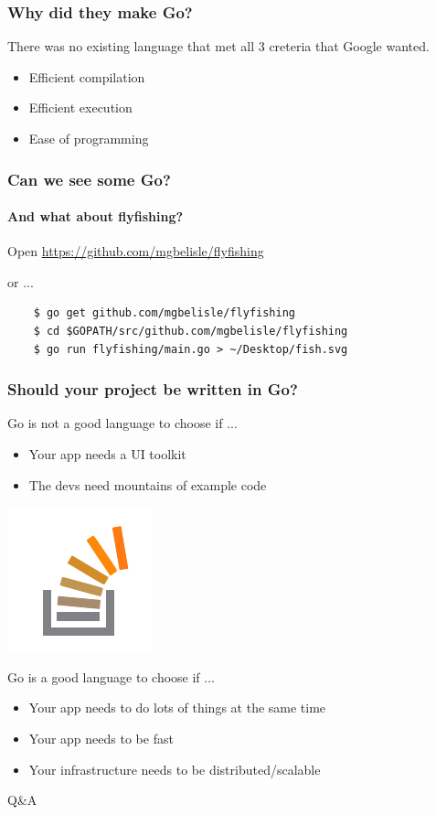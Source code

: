 \documentclass{beamer}
\begin{document}
\begin{frame}
  \frametitle{Why did they make Go?}

  There was no existing language that met all 3 creteria that Google
  wanted.
  
  \begin{itemize}
    \item Efficient compilation
    \item Efficient execution
    \item Ease of programming
  \end{itemize}
\end{frame}
\begin{frame}[fragile]
  \frametitle{Can we see some Go?}
  \framesubtitle{And what about flyfishing?}
  \begin{center}
    Open \url{https://github.com/mgbelisle/flyfishing}
    \bigskip

    or ...
  \end{center}  
  \begin{verbatim}
    $ go get github.com/mgbelisle/flyfishing
    $ cd $GOPATH/src/github.com/mgbelisle/flyfishing
    $ go run flyfishing/main.go > ~/Desktop/fish.svg
  \end{verbatim}
\end{frame}
\begin{frame}
  \frametitle{Should your project be written in Go?}
  Go is not a good language to choose if ...
  \begin{itemize}
    \item Your app needs a UI toolkit
    \item The devs need mountains of example code
  \end{itemize}
  \vfill
  \begin{flushright}
    \includegraphics[height=3\baselineskip]{includes/stackoverflow.png}
  \end{flushright}
\end{frame}
\begin{frame}
  Go is a good language to choose if ...
  \begin{itemize}
    \item Your app needs to do lots of things at the same time
    \item Your app needs to be fast
    \item Your infrastructure needs to be distributed/scalable
  \end{itemize}
\end{frame}
\begin{frame}
  \begin{center}
    {\huge Q\&A}
  \end{center}
\end{frame}
\end{document}
